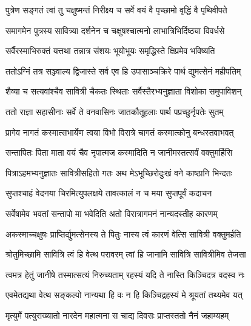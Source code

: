 \twolineshloka
{पुत्रेण सङ्गतं त्वां तु चक्षुष्मन्तं निरीक्ष्य च}
{सर्वे वयं वै पृच्छामो वृद्धिं वै पृथिवीपते}


\twolineshloka
{समागमेन पुत्रस्य सावित्र्या दर्शनेन च}
{चक्षुषश्चात्मनो लाभात्रिभिर्दिष्ठ्या विवर्धसे}


\twolineshloka
{सर्वैरस्माभिरुक्तं यत्तथा तन्नात्र संशयः}
{भूयोभूयः समृद्धिस्ते क्षिप्रमेव भविष्यति}




\twolineshloka
{ततोऽग्निं तत्र सञ्ज्वाल्य द्विजास्ते सर्व एव हि}
{उपासाञ्चक्रिरे पार्थ द्युमत्सेनं महीपतिम्}


\twolineshloka
{शैव्या च सत्यवांश्चैव सावित्री चैकतः स्थिताः}
{सर्वैस्तैरभ्यनुज्ञाता विशोका समुपाविशन्}


\twolineshloka
{ततो राज्ञा सहासीनाः सर्वे ते वनवासिनः}
{जातकौतूहलाः पार्थ पप्रच्छुर्नृपतेः सुतम्}


\twolineshloka
{प्रागेव नागतं कस्मात्सभार्येण त्वया विभो}
{विरात्रे चागतं कस्मात्कोनु बन्धस्तवाभवत्}


\twolineshloka
{सन्तापितः पिता माता वयं चैव नृपात्मज}
{कस्मादिति न जानीमस्तत्सर्वं वक्तुमर्हिसि}




\twolineshloka
{पित्राऽहमभ्यनुज्ञातः सावित्रीसहितो गतः}
{अथ मेऽभूच्छिरोदुःखं वने काष्ठानि भिन्दतः}


\twolineshloka
{सुप्तश्चाहं वेदनया चिरमित्युपलक्षये}
{तावत्कालं न च मया सुप्तपूर्वं कदाचन}


\twolineshloka
{सर्वेषामेव भवतां सन्तापो मा भवेदिति}
{अतो विरात्रागमनं नान्यदस्तीह कारणम्}




\twolineshloka
{अकस्माच्चक्षुषः प्राप्तिर्द्युमत्सेनस्य ते पितुः}
{नास्य त्वं कारणं वेत्सि सावित्री वक्तुमर्हति}


\twolineshloka
{श्रोतुमिच्छामि सावित्रि त्वं हि वेत्थ परावरम्}
{त्वां हि जानामि सावित्रि सावित्रीमिव तेजसा}


\twolineshloka
{त्वमत्र हेतुं जानीषे तस्मात्सत्यं निरुच्यताम्}
{रहस्यं यदि ते नास्ति किञ्चिदत्र वदस्व नः}




\twolineshloka
{एवमेतद्यथा वेत्थ सङ्कल्पो नान्यथा हि वः}
{न हि किञ्चिद्रहस्यं मे श्रूयतां तथ्यमेव यत्}


\twolineshloka
{मृत्युर्मे पत्युराख्यातो नारदेन महात्मना}
{स चाद्य दिवसः प्राप्तस्ततो नैनं जहाम्यहम्}


